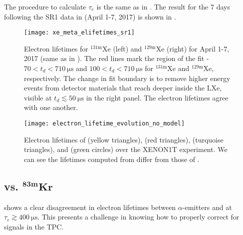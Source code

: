 The procedure to calculate $\tau_e$ is the same as in .  The result for the
7 days following the SR1 \ambe data in  (April 1-7, 2017)
is shown in .

\begin{figure}
\centering
\texttt{[image: xe\_meta\_elifetimes\_sr1]}
\caption{Electron lifetimes for $\mathrm{^{131m}Xe}$ (left) and $\mathrm{^{129m}Xe}$ (right) for April 1-7, 2017 (same as in
).  The red lines mark the region of the fit - $70 < t_d < 710\ \mathrm{\mu s}$
and $100 < t_d < 710\ \mathrm{\mu s}$ for $\mathrm{^{131m}Xe}$ and $\mathrm{^{129m}Xe}$, respectively.  The change in fit boundary is to
remove higher energy events from detector materials that reach deeper inside the LXe, visible at $t_d \lesssim 50\ \mathrm{\mu s}$ in the
right panel.  The electron lifetimes agree with one another.}
\label{fig:electron_lifetimes_measurement_gammas_elifetime}
\end{figure}

\begin{figure}
\centering
\texttt{[image: electron\_lifetime\_evolution\_no\_model]}
\caption{Electron lifetimes of  (yellow triangles),  (red triangles),  (turquoise triangles), and
\metakr (green circles) over the
XENON1T experiment.  We can see the lifetimes computed from \alphadecays differ from those of \metakr.}
\label{fig:electron_lifetimes_evolution_no_model}
\end{figure}



\subsection{ vs. $\mathbf{^{83m}Kr}$}
\label{subsec:electron_lifetimes_rn222_vs_kr83m}
 shows a clear disagreement in electron lifetimes between $\alpha$-emitters and \metakr
at $\tau_e \gtrsim 400\ \mathrm{\mu s}$.  This presents a challenge in knowing how to properly correct \stwob for signals in the TPC.

